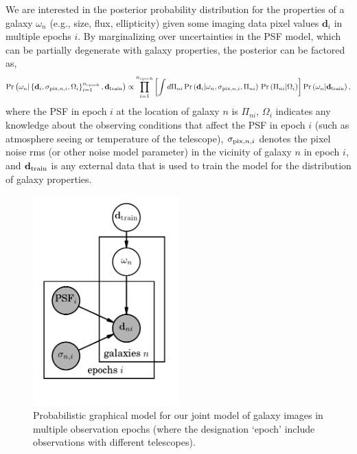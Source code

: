 \documentclass[11pt, letterpaper]{article}
\newcommand{\galprops}{\omega}
\newcommand{\psf}{{\Pi}}
\newcommand{\obscond}{\Omega}
\newcommand{\noisermsni}{\sigma_{{\rm pix},n,i}}
\newcommand{\nepoch}{n_{\rm epoch}}
\def\pr{{\rm Pr}}
\newcommand{\prf}[1]{\pr\left(#1\right)}
\def\datai{\mathbf{d}_i}
\newcommand{\trainingdata}{\mathbf{d}_{\rm train}}
\begin{document}
We are interested in the posterior probability distribution for the properties of a galaxy
$\galprops_{n}$ (e.g., size, flux, ellipticity) given some imaging data pixel values
$\datai$ in multiple epochs $i$. By marginalizing over uncertainties in the PSF model, 
which can be partially degenerate with galaxy properties, the posterior can be 
factored as,
\begin{equation}
	\prf{\galprops_{n} | \left\{\datai, \noisermsni, \obscond_{i}\right\}_{i=1}^{\nepoch}, 
		\trainingdata} \propto
	\prod_{i=1}^{\nepoch}
	\left[	
	\int d\psf_{ni}\,
	\prf{\datai | \galprops_n, \noisermsni, \psf_{ni}}\,
	\prf{\psf_{ni} | \obscond_{i}}
	\right]
	\prf{\galprops_{n}| \trainingdata},
\end{equation}
where the PSF in epoch $i$ at the location of galaxy $n$ is $\psf_{ni}$,
$\obscond_{i}$ indicates any knowledge about the observing conditions that affect 
the PSF in epoch $i$ (such as atmosphere seeing or temperature of the telescope), 
$\noisermsni$ denotes the pixel noise rms (or other noise model parameter) in the 
vicinity of galaxy $n$ in epoch $i$, and $\trainingdata$ is any external data that is 
used to train the model for the distribution of galaxy properties.

\begin{figure}[htb]
	\centerline{
		\includegraphics[width=0.5\textwidth]{pgm.png}
	}
	\caption{\label{fig:pgm}Probabilistic graphical model for our joint model of 
	galaxy images in multiple observation epochs (where the designation 
	`epoch' include observations with different telescopes).}
\end{figure}
\end{document}
